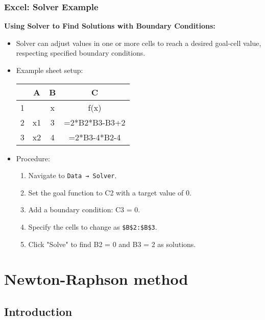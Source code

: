 \begin{frame}[fragile]
  \frametitle{Excel: Solver Example}

  \textbf{Using Solver to Find Solutions with Boundary Conditions:}
  \begin{itemize}
    \item Solver can adjust values in one or more cells to reach a desired goal-cell value, respecting specified boundary conditions.
    \item Example sheet setup:

          \begin{tabular}{|c|c|c|c|}
            \hline
              & A  & B & C             \\
            \hline
            1 &    & x & f(x)          \\
            \hline
            2 & x1 & 3 & =2*B2*B3-B3+2 \\
            \hline
            3 & x2 & 4 & =2*B3-4*B2-4  \\
            \hline
          \end{tabular}

    \item Procedure:
          \begin{enumerate}
            \item Navigate to \texttt{Data → Solver}.
            \item Set the goal function to C2 with a target value of 0.
            \item Add a boundary condition: C3 = 0.
            \item Specify the cells to change as \texttt{\$B\$2:\$B\$3}.
            \item Click "Solve" to find B2 = 0 and B3 = 2 as solutions.
          \end{enumerate}
  \end{itemize}
\end{frame}


\section{Newton-Raphson method}
\subsection*{Introduction}

